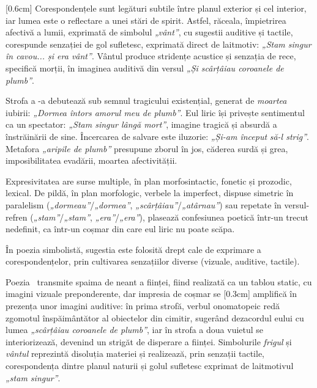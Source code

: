 [0.6cm]
Corespondențele sunt legături subtile între planul exterior și cel interior, iar lumea este o reflectare a unei stări de spirit. Astfel, răceala, împietrirea afectivă a lumii, exprimată de simbolul \textit{„vânt”}, cu sugestii auditive și tactile, corespunde senzației de gol sufletesc, exprimată direct de laitmotiv: \textit{„Stam singur în cavou... și era vânt”}. Vântul produce stridențe acustice și senzația de rece, specifică morții, în imaginea auditivă din versul \textit{„Și scârțâiau coroanele de plumb”}.

Strofa a -a debutează sub semnul tragicului existențial, generat de \textit{moartea} iubirii: \textit{„Dormea întors amorul meu de plumb”}. Eul liric își privește sentimentul ca un spectator: \textit{„Stam singur lângă mort”}, imagine tragică și absurdă a înstrăinării de sine. Încercarea de salvare este iluzorie: \textit{„Și-am început} \textsl{să-l strig}\textit{”}. Metafora \textit{„aripile de plumb”} presupune zborul în jos, căderea surdă și grea, imposibilitatea evadării, moartea afectivității.

Expresivitatea are surse multiple, în plan morfosintactic, fonetic și prozodic, lexical. De pildă, în plan morfologic, verbele la imperfect, dispuse simetric în paralelism (\textit{„dormeau”}/\textit{„dormea”}, \textit{„scârțâiau”}/\textit{„atârnau”}) sau repetate în versul-refren (\textit{„stam”}/\textit{„stam”}, \textit{„era”}/\textit{„era”}), plasează confesiunea poetică într-un trecut nedefinit, ca într-un coșmar din care eul liric nu poate scăpa.

În poezia simbolistă, sugestia este folosită drept cale de exprimare a corespondențelor, prin cultivarea senzațiilor diverse (vizuale, auditive, tactile).

Poezia \operatitle\ transmite spaima de neant a ființei, fiind realizată ca un tablou static, cu imagini vizuale preponderente, dar impresia de coșmar se
[0.3cm]
amplifică în prezența unor imagini auditive: în prima strofă, verbul onomatopeic redă zgomotul înspăimântător al obiectelor din cimitir, sugerând dezacordul eului cu lumea \textit{„scârțâiau coroanele de plumb”}, iar în strofa a doua vuietul se interiorizează, devenind un strigăt de disperare a ființei. Simbolurile \textit{frigul} și \textit{vântul} reprezintă disoluția materiei și realizează, prin senzații tactile, corespondența dintre planul naturii și golul sufletesc exprimat de laitmotivul \textit{„stam singur”}.

